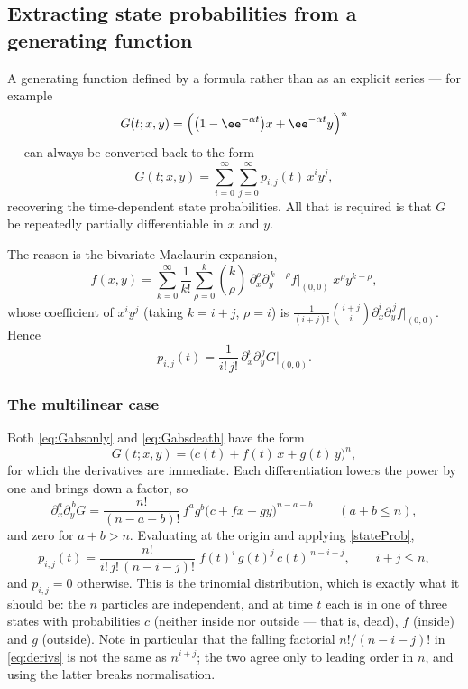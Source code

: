 \subsection{Extracting state probabilities from a generating function}
\label{app:extract}

A generating function defined by a formula rather than as an explicit series --- for
example
\begin{equation}
\label{examplePgf}
G(t;x,y) = \Bigl(\bigl(1-\ee^{-\alpha t}\bigr)x + \ee^{-\alpha t}y\Bigr)^n
\end{equation}
--- can always be converted back to the form
\begin{equation}
\label{series1}
G(t;x,y) = \sum^{\infty}_{i=0}\sum^{\infty}_{j=0} p_{i,j}(t)\,x^iy^j ,
\end{equation}
recovering the time-dependent state probabilities. All that is required is that $G$ be
repeatedly partially differentiable in $x$ and $y$.

The reason is the bivariate Maclaurin expansion,
\begin{equation*}
f(x,y) = \sum^{\infty}_{k=0}\frac{1}{k!}\sum^{k}_{\rho=0}\binom{k}{\rho}\,\partial_x^{\rho}\partial_y^{\,k-\rho}f\Big|_{(0,0)}\;x^{\rho}y^{k-\rho} ,
\end{equation*}
whose coefficient of $x^iy^j$ (taking $k=i+j$, $\rho=i$) is
$\frac{1}{(i+j)!}\binom{i+j}{i}\partial_x^i\partial_y^{\,j}f\big|_{(0,0)}$. Hence
\begin{equation}
\label{stateProb}
p_{i,j}(t) = \frac{1}{i!\,j!}\,\partial_x^i\partial_y^{\,j}G\Big|_{(0,0)} .
\end{equation}

\subsubsection*{The multilinear case}

Both \cref{eq:Gabsonly} and \cref{eq:Gabsdeath} have the form
\begin{equation}
\label{eq:multilinear}
G(t;x,y) = \bigl(c(t) + f(t)\,x + g(t)\,y\bigr)^n ,
\end{equation}
for which the derivatives are immediate. Each differentiation lowers the power by one
and brings down a factor, so
\begin{equation}
\label{eq:derivs}
\partial_x^{a}\partial_y^{\,b}G = \frac{n!}{(n-a-b)!}\,f^{a}g^{b}\bigl(c+fx+gy\bigr)^{n-a-b}
\qquad (a+b\le n),
\end{equation}
and zero for $a+b>n$. Evaluating at the origin and applying \cref{stateProb},
\begin{equation}
\label{stateProbSpec}
p_{i,j}(t) = \frac{n!}{i!\,j!\,(n-i-j)!}\;f(t)^{i}\,g(t)^{j}\,c(t)^{\,n-i-j},
\qquad i+j\le n,
\end{equation}
and $p_{i,j}=0$ otherwise. This is the trinomial distribution, which is exactly what it
should be: the $n$ particles are independent, and at time $t$ each is in one of three
states with probabilities $c$ (neither inside nor outside --- that is, dead), $f$
(inside) and $g$ (outside). Note in particular that the falling factorial
$n!/(n-i-j)!$ in \cref{eq:derivs} is not the same as $n^{i+j}$; the two agree only to
leading order in $n$, and using the latter breaks normalisation.


